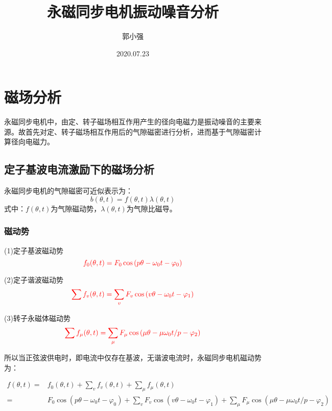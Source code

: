\documentclass[11pt,a4paper]{article}
\title{永磁同步电机振动噪音分析}
\author{郭小强}
\date{2020.07.23}
\begin{document}
\maketitle
\section{磁场分析}
永磁同步电机中，由定、转子磁场相互作用产生的径向电磁力是振动噪音的主要来源。故首先对定、转子磁场相互作用后的气隙磁密进行分析，进而基于气隙磁密计算径向电磁力。
\subsection{定子基波电流激励下的磁场分析}
永磁同步电机的气隙磁密可近似表示为：
\begin{equation} \label{eq:air gap flux density}
b(\theta, t)=f(\theta, t) \lambda(\theta, t)
\end{equation}
式中：$f(\theta, t)$为气隙磁动势，$\lambda(\theta, t)$为气隙比磁导。

\subsubsection{磁动势}
\par
(1)定子基波磁动势
\begin{equation} \label{eq:fundaMMF}
\textcolor{red}{
f_{0}(\theta, t)=F_{0} \cos \left(p \theta-\omega_{0} t-\varphi_{0}\right)}
\end{equation}
\par
(2)定子谐波磁动势
\begin{equation}
\textcolor{red}{
\sum f_{v}(\theta, t)=\sum_{v} F_{v} \cos \left(v \theta-\omega_{0} t-\varphi_{1}\right)}
\end{equation}
\par
(3)转子永磁体磁动势
\begin{equation}
\textcolor{red}{\sum f_{\mu}(\theta, t)=\sum_{\mu} F_{\mu} \cos \left(\mu \theta-\mu \omega_{0} t / p-\varphi_{2}\right)}
\end{equation}
\par
所以当正弦波供电时，即电流中仅存在基波，无谐波电流时，永磁同步电机磁动势为：
\par
\begin{equation}
\begin{aligned}
f(\theta, t)=& f_{0}(\theta, t)+\sum_{v} f_{v}(\theta, t)+\sum_{\mu} f_{\mu}(\theta, t) \\
=& F_{0} \cos \left(p \theta-\omega_{0} t-\varphi_{0}\right) +\sum_{v} F_{v} \cos \left(v \theta-\omega_{0} t-\varphi_{1}\right)  
+\sum_{\mu} F_{\mu} \cos \left(\mu \theta-\mu \omega_{0} t / p-\varphi_{2}\right)
\end{aligned}
\end{equation}
\end{document}
